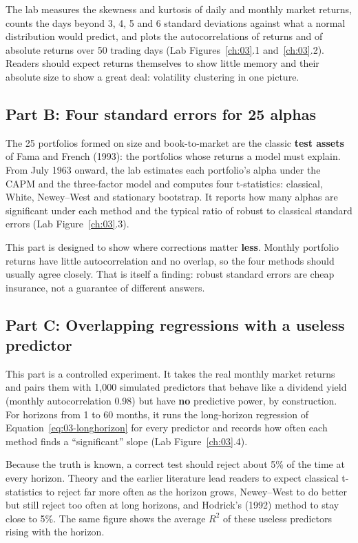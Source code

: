 The lab measures the skewness and kurtosis of daily and monthly market returns, counts the days beyond 3, 4, 5 and 6 standard deviations against what a normal distribution would predict, and plots the autocorrelations of returns and of absolute returns over 50 trading days (Lab Figures~\ref{ch:03}.1 and~\ref{ch:03}.2). Readers should expect returns themselves to show little memory and their absolute size to show a great deal: volatility clustering in one picture.

\subsection*{Part B: Four standard errors for 25 alphas}

The 25 portfolios formed on size and book-to-market are the classic \textbf{test assets} of Fama and French (1993): the portfolios whose returns a model must explain. From July 1963 onward, the lab estimates each portfolio's alpha under the CAPM and the three-factor model and computes four t-statistics: classical, White, Newey--West and stationary bootstrap. It reports how many alphas are significant under each method and the typical ratio of robust to classical standard errors (Lab Figure~\ref{ch:03}.3).

This part is designed to show where corrections matter \textbf{less}. Monthly portfolio returns have little autocorrelation and no overlap, so the four methods should usually agree closely. That is itself a finding: robust standard errors are cheap insurance, not a guarantee of different answers.

\subsection*{Part C: Overlapping regressions with a useless predictor}

This part is a controlled experiment. It takes the real monthly market returns and pairs them with 1,000 simulated predictors that behave like a dividend yield (monthly autocorrelation 0.98) but have \textbf{no} predictive power, by construction. For horizons from 1 to 60 months, it runs the long-horizon regression of Equation~\eqref{eq:03-longhorizon} for every predictor and records how often each method finds a ``significant'' slope (Lab Figure~\ref{ch:03}.4).

Because the truth is known, a correct test should reject about 5\% of the time at every horizon. Theory and the earlier literature lead readers to expect classical t-statistics to reject far more often as the horizon grows, Newey--West to do better but still reject too often at long horizons, and Hodrick's (1992) method to stay close to 5\%. The same figure shows the average $R^2$ of these useless predictors rising with the horizon.

